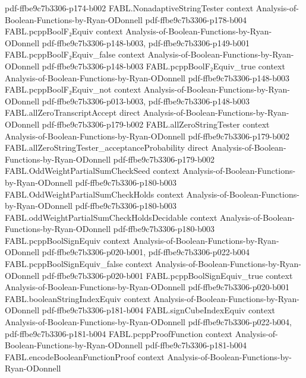 \begin{theorem}
  {pdf-ffbe9c7b3306-p174-b002}
\proofstep
  {FABL.NonadaptiveStringTester}
  {context}
  {Analysis-of-Boolean-Functions-by-Ryan-ODonnell}
  {pdf-ffbe9c7b3306-p178-b004}
\proofstep
  {FABL.pcppBoolF₂Equiv}
  {context}
  {Analysis-of-Boolean-Functions-by-Ryan-ODonnell}
  {pdf-ffbe9c7b3306-p148-b003,
    pdf-ffbe9c7b3306-p149-b001}
\proofstep
  {FABL.pcppBoolF₂Equiv_false}
  {context}
  {Analysis-of-Boolean-Functions-by-Ryan-ODonnell}
  {pdf-ffbe9c7b3306-p148-b003}
\proofstep
  {FABL.pcppBoolF₂Equiv_true}
  {context}
  {Analysis-of-Boolean-Functions-by-Ryan-ODonnell}
  {pdf-ffbe9c7b3306-p148-b003}
\proofstep
  {FABL.pcppBoolF₂Equiv_not}
  {context}
  {Analysis-of-Boolean-Functions-by-Ryan-ODonnell}
  {pdf-ffbe9c7b3306-p013-b003,
    pdf-ffbe9c7b3306-p148-b003}
\proofstep
  {FABL.allZeroTranscriptAccept}
  {direct}
  {Analysis-of-Boolean-Functions-by-Ryan-ODonnell}
  {pdf-ffbe9c7b3306-p179-b002}
\proofstep
  {FABL.allZeroStringTester}
  {context}
  {Analysis-of-Boolean-Functions-by-Ryan-ODonnell}
  {pdf-ffbe9c7b3306-p179-b002}
\proofstep
  {FABL.allZeroStringTester_acceptanceProbability}
  {direct}
  {Analysis-of-Boolean-Functions-by-Ryan-ODonnell}
  {pdf-ffbe9c7b3306-p179-b002}
\proofstep
  {FABL.OddWeightPartialSumCheckSeed}
  {context}
  {Analysis-of-Boolean-Functions-by-Ryan-ODonnell}
  {pdf-ffbe9c7b3306-p180-b003}
\proofstep
  {FABL.OddWeightPartialSumCheckHolds}
  {context}
  {Analysis-of-Boolean-Functions-by-Ryan-ODonnell}
  {pdf-ffbe9c7b3306-p180-b003}
\proofstep
  {FABL.oddWeightPartialSumCheckHoldsDecidable}
  {context}
  {Analysis-of-Boolean-Functions-by-Ryan-ODonnell}
  {pdf-ffbe9c7b3306-p180-b003}
\proofstep
  {FABL.pcppBoolSignEquiv}
  {context}
  {Analysis-of-Boolean-Functions-by-Ryan-ODonnell}
  {pdf-ffbe9c7b3306-p020-b001,
    pdf-ffbe9c7b3306-p022-b004}
\proofstep
  {FABL.pcppBoolSignEquiv_false}
  {context}
  {Analysis-of-Boolean-Functions-by-Ryan-ODonnell}
  {pdf-ffbe9c7b3306-p020-b001}
\proofstep
  {FABL.pcppBoolSignEquiv_true}
  {context}
  {Analysis-of-Boolean-Functions-by-Ryan-ODonnell}
  {pdf-ffbe9c7b3306-p020-b001}
\proofstep
  {FABL.booleanStringIndexEquiv}
  {context}
  {Analysis-of-Boolean-Functions-by-Ryan-ODonnell}
  {pdf-ffbe9c7b3306-p181-b004}
\proofstep
  {FABL.signCubeIndexEquiv}
  {context}
  {Analysis-of-Boolean-Functions-by-Ryan-ODonnell}
  {pdf-ffbe9c7b3306-p022-b004,
    pdf-ffbe9c7b3306-p181-b004}
\proofstep
  {FABL.pcppProofFunction}
  {context}
  {Analysis-of-Boolean-Functions-by-Ryan-ODonnell}
  {pdf-ffbe9c7b3306-p181-b004}
\proofstep
  {FABL.encodeBooleanFunctionProof}
  {context}
  {Analysis-of-Boolean-Functions-by-Ryan-ODonnell}

\end{theorem}
